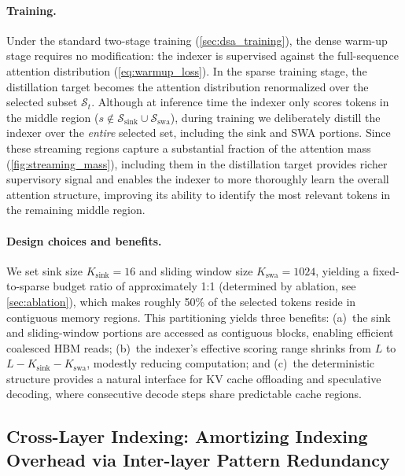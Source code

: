 \documentclass{article}
\begin{document}
\paragraph{Training.}
Under the standard two-stage training (\cref{sec:dsa_training}), the dense warm-up stage requires no modification: the indexer is supervised against the full-sequence attention distribution (\cref{eq:warmup_loss}). In the sparse training stage, the distillation target becomes the attention distribution renormalized over the selected subset $\mathcal{S}_t$. Although at inference time the indexer only scores tokens in the middle region ($s \notin \mathcal{S}_{\text{sink}} \cup \mathcal{S}_{\text{swa}}$), during training we deliberately distill the indexer over the \emph{entire} selected set, including the sink and SWA portions. Since these streaming regions capture a substantial fraction of the attention mass (\cref{fig:streaming_mass}), including them in the distillation target provides richer supervisory signal and enables the indexer to more thoroughly learn the overall attention structure, improving its ability to identify the most relevant tokens in the remaining middle region.

\paragraph{Design choices and benefits.}
We set sink size $K_{\text{sink}} = 16$ and sliding window size $K_{\text{swa}} = 1024$, yielding a fixed-to-sparse budget ratio of approximately 1:1 (determined by ablation, see \cref{sec:ablation}), which makes roughly 50\% of the selected tokens reside in contiguous memory regions. This partitioning yields three benefits: (a)~the sink and sliding-window portions are accessed as contiguous blocks, enabling efficient coalesced HBM reads; (b)~the indexer's effective scoring range shrinks from $L$ to $L - K_{\text{sink}} - K_{\text{swa}}$, modestly reducing computation; and (c)~the deterministic structure provides a natural interface for KV cache offloading and speculative decoding, where consecutive decode steps share predictable cache regions.

\subsection{Cross-Layer Indexing: Amortizing Indexing Overhead via Inter-layer Pattern Redundancy}
\label{sec:cli}
\end{document}
